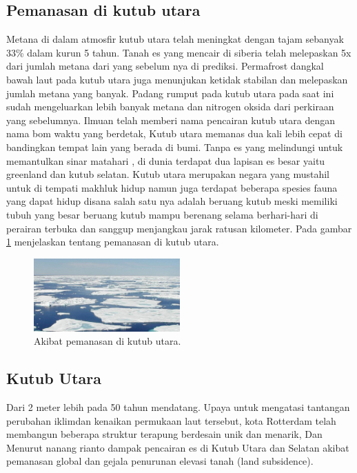 \subsection{Pemanasan di kutub utara}
		Metana di dalam atmosfir kutub utara telah meningkat dengan tajam sebanyak 33\% dalam kurun 5 tahun. Tanah es yang mencair di siberia telah melepaskan 5x dari jumlah metana dari yang sebelum nya di prediksi. Permafrost dangkal bawah laut pada kutub utara juga menunjukan ketidak stabilan dan melepaskan jumlah metana
	yang banyak. Padang rumput pada kutub utara pada saat ini sudah mengeluarkan lebih banyak metana dan nitrogen oksida dari perkiraan yang sebelumnya. Ilmuan telah memberi nama pencairan kutub utara dengan nama bom waktu yang berdetak, Kutub utara memanas dua kali lebih cepat di bandingkan tempat lain yang berada di bumi. Tanpa es yang melindungi untuk memantulkan sinar matahari , di dunia terdapat dua lapisan es besar yaitu greenland dan kutub selatan. Kutub utara merupakan
	negara yang mustahil untuk di tempati makhluk hidup namun juga terdapat beberapa spesies fauna yang dapat hidup disana salah satu nya adalah beruang kutub
	meski memiliki tubuh yang besar beruang kutub mampu berenang selama berhari-hari di perairan terbuka dan sanggup menjangkau jarak ratusan kilometer. Pada gambar \ref{Pemanasan_Kutub_Utara} menjelaskan tentang pemanasan di kutub utara.

\begin{figure}[ht]
\centerline{\includegraphics[width=0.5\textwidth]{figures/arctic1.pdf}}
\caption{Akibat pemanasan di kutub utara.}	
\label{Pemanasan_Kutub_Utara}
\end{figure}



\subsection{Kutub Utara}	
Dari 2 meter lebih pada 50 tahun 
	mendatang. Upaya untuk mengatasi tantangan perubahan iklimdan kenaikan permukaan laut tersebut, kota Rotterdam telah membangun beberapa struktur terapung 
	berdesain unik dan menarik, Dan Menurut nanang rianto dampak pencairan es di Kutub Utara dan Selatan akibat pemanasan global dan gejala penurunan elevasi
	tanah (land subsidence).
	
